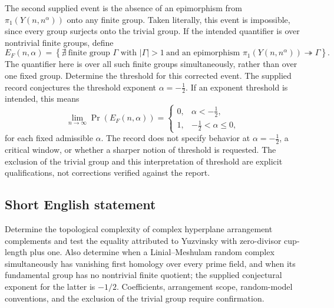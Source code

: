 \documentclass[11pt]{article}
\begin{document}
The second supplied event is the absence of an epimorphism from \(\pi_1(Y(n,n^\alpha))\) onto any finite group. Taken literally, this event is impossible, since every group surjects onto the trivial group. If the intended quantifier is over nontrivial finite groups, define
\[
E_F(n,\alpha)=\left\{\nexists\ \text{finite group }\Gamma\text{ with }|\Gamma|>1\ \text{and an epimorphism }\pi_1(Y(n,n^\alpha))\twoheadrightarrow\Gamma\right\}.
\]
The quantifier here is over all such finite groups simultaneously, rather than over one fixed group. Determine the threshold for this corrected event. The supplied record conjectures the threshold exponent \(\alpha=-\tfrac12\). If an exponent threshold is intended, this means
\[
\lim_{n\to\infty}\Pr(E_F(n,\alpha))=
\begin{cases}
0,&\alpha<-\tfrac12,\\
1,&-\tfrac12<\alpha\leq0,
\end{cases}
\]
for each fixed admissible \(\alpha\). The record does not specify behavior at \(\alpha=-\tfrac12\), a critical window, or whether a sharper notion of threshold is requested. The exclusion of the trivial group and this interpretation of threshold are explicit qualifications, not corrections verified against the report.
\subsection{Short English statement}
Determine the topological complexity of complex hyperplane arrangement complements and test the equality attributed to Yuzvinsky with zero-divisor cup-length plus one. Also determine when a Linial--Meshulam random complex simultaneously has vanishing first homology over every prime field, and when its fundamental group has no nontrivial finite quotient; the supplied conjectural exponent for the latter is \(-1/2\). Coefficients, arrangement scope, random-model conventions, and the exclusion of the trivial group require confirmation.
\end{document}
